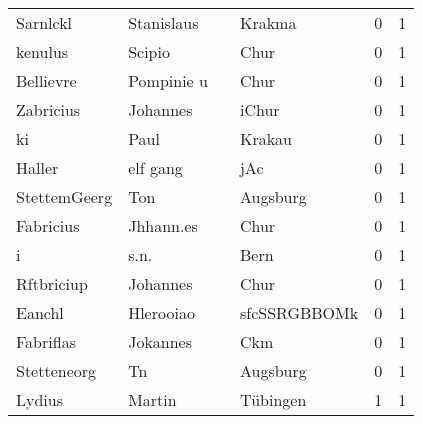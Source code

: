 \documentclass[10pt,a4paper,landscape]{article}
\begin{document}
\begin{longtable}{llllrr}
                 Sarnlckl &                         Stanislaus &             &                                      Krakma &          0 &         1 \\
                  kenulus &                             Scipio &             &                                        Chur &          0 &         1 \\
                Bellievre &                         Pompinie u &             &                                        Chur &          0 &         1 \\
                Zabricius &                           Johannes &             &                                       iChur &          0 &         1 \\
                       ki &                               Paul &             &                                      Krakau &          0 &         1 \\
                   Haller &                           elf gang &             &                                         jAc &          0 &         1 \\
             StettemGeerg &                                Ton &             &                                    Augsburg &          0 &         1 \\
                Fabricius &                          Jhhann.es &             &                                        Chur &          0 &         1 \\
                        i &                               s.n. &             &                                        Bern &          0 &         1 \\
               Rftbriciup &                           Johannes &             &                                        Chur &          0 &         1 \\
                   Eanchl &                          Hlerooiao &             &                                sfcSSRGBBOMk &          0 &         1 \\
                Fabriflas &                           Jokannes &             &                                         Ckm &          0 &         1 \\
              Stetteneorg &                                 Tn &             &                                    Augsburg &          0 &         1 \\
                   Lydius &                             Martin &             &                                    Tübingen &          1 &         1 \\

\end{longtable}
\end{document}
